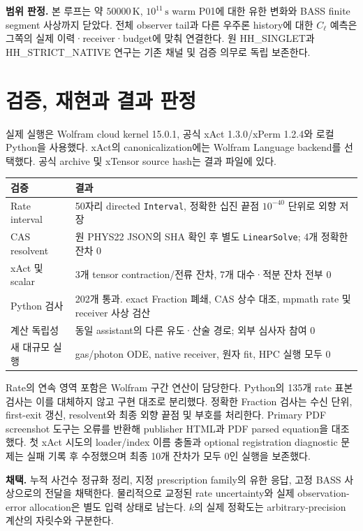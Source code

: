 \documentclass[11pt,a4paper]{article}
\begin{document}
\textbf{범위 판정.} 본 루프는 약 $50000\,\mathrm K$, $10^{11}\,\mathrm s$ warm P01에 대한 유한 변화와 BASS finite segment 사상까지 닫았다. 전체 observer tail과 다른 우주론 history에 대한 $C_\ell$ 예측은 그쪽의 실제 이력·receiver·budget에 맞춰 연결한다. 원 HH\_SINGLET과 HH\_STRICT\_NATIVE 연구는 기존 채널 및 검증 의무로 독립 보존한다.

\newpage
\section{검증, 재현과 결과 판정}
실제 실행은 Wolfram cloud kernel 15.0.1, 공식 xAct 1.3.0/xPerm 1.2.4와 로컬 Python을 사용했다. xAct의 canonicalization에는 Wolfram Language backend를 선택했다. 공식 archive 및 xTensor source hash는 결과 파일에 있다.

\begin{center}\begin{tabularx}{\linewidth}{@{}lX@{}}\toprule
검증 & 결과\\\midrule
Rate interval & 50자리 directed \texttt{Interval}, 정확한 십진 끝점 $10^{-40}$ 단위로 외향 저장\\
CAS resolvent & 원 PHYS22 JSON의 SHA 확인 후 별도 \texttt{LinearSolve}; 4개 정확한 잔차 0\\
xAct 및 scalar & 3개 tensor contraction/전류 잔차, 7개 대수·적분 잔차 전부 0\\
Python 검사 & 202개 통과. exact Fraction 폐쇄, CAS 상수 대조, mpmath rate 및 receiver 사상 검산\\
계산 독립성 & 동일 assistant의 다른 유도·산술 경로; 외부 심사자 참여 0\\
새 대규모 실행 & gas/photon ODE, native receiver, 원자 fit, HPC 실행 모두 0\\\bottomrule
\end{tabularx}\end{center}

Rate의 연속 영역 포함은 Wolfram 구간 연산이 담당한다. Python의 135개 rate 표본 검사는 이를 대체하지 않고 구현 대조로 분리했다. 정확한 Fraction 검사는 수신 단위, first-exit 갱신, resolvent와 최종 외향 끝점 및 부호를 처리한다. Primary PDF screenshot 도구는 오류를 반환해 publisher HTML과 PDF parsed equation을 대조했다. 첫 xAct 시도의 loader/index 이름 충돌과 optional registration diagnostic 문제는 실패 기록 후 수정했으며 최종 10개 잔차가 모두 0인 실행을 보존했다.

\textbf{채택.} 누적 사건수 정규화 정리, 지정 prescription family의 유한 응답, 고정 BASS 사상으로의 전달을 채택한다. 물리적으로 교정된 rate uncertainty와 실제 observation-error allocation은 별도 입력 상태로 남는다. $k$의 실제 정확도는 arbitrary-precision 계산의 자릿수와 구분한다.
\end{document}
